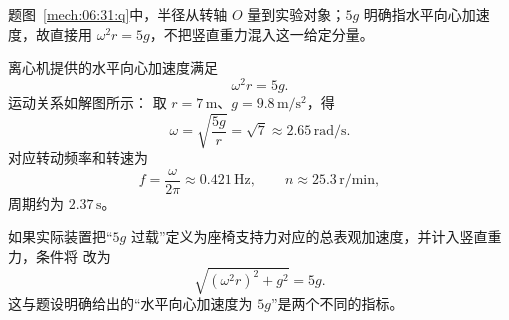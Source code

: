 {\begin{xesolution}题图~\ref{mech:06:31:q}中，半径从转轴 $O$ 量到实验对象；$5g$ 明确指水平向心加速度，故直接用 $\omega^2r=5g$，不把竖直重力混入这一给定分量。

离心机提供的水平向心加速度满足
\[
 \omega^2r=5g.
\]
运动关系如解图所示：
\soldiagTwoThirtyOne
取 $r=7\,\mathrm m$、$g=9.8\,\mathrm{m/s^2}$，得
\[
 \boxed{\omega=\sqrt{\frac{5g}{r}}=\sqrt7
 \approx2.65\,\mathrm{rad/s}}.
\]
对应转动频率和转速为
\[
 f=\frac{\omega}{2\pi}\approx0.421\,\mathrm{Hz},
 \qquad
 \boxed{n\approx25.3\,\mathrm{r/min}},
\]
周期约为 $2.37\,\mathrm s$。

如果实际装置把“$5g$ 过载”定义为座椅支持力对应的总表观加速度，并计入竖直重力，条件将
改为
\[
 \sqrt{(\omega^2r)^2+g^2}=5g.
\]
这与题设明确给出的“水平向心加速度为 $5g$”是两个不同的指标。
\end{xesolution}
}

\endgroup
